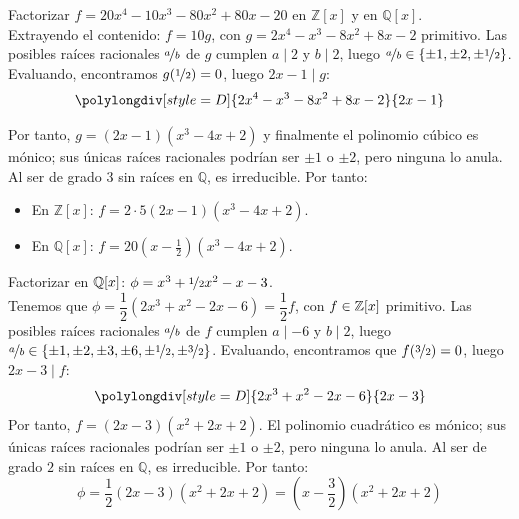 \begin{ejemplo}
    Factorizar $f = 20x^4 - 10x^3 - 80x^2 + 80x - 20$ en $\mathbb{Z}[x]$ y en $\mathbb{Q}[x]$.\\

    Extrayendo el contenido: $f = 10 g$, con $g = 2x^4 - x^3 - 8x^2 + 8x - 2$ primitivo. Las posibles raíces racionales $\nicefrac{a}{b}$ de $g$ cumplen $a \mid 2$ y $b \mid 2$, luego $\nicefrac{a}{b} \in \{\pm 1, \pm 2, \pm \nicefrac{1}{2}\}$. Evaluando, encontramos $g(\nicefrac{1}{2}) = 0$, luego $2x - 1 \mid g$:
    \begin{equation*}
        \polylongdiv[style=D]{2x^4 - x^3 - 8x^2 + 8x - 2}{2x - 1}
    \end{equation*}

    Por tanto, $g = (2x - 1)(x^3 - 4x + 2)$ y finalmente el polinomio cúbico es mónico; sus únicas raíces racionales podrían ser $\pm 1$ o $\pm 2$, pero ninguna lo anula. Al ser de grado $3$ sin raíces en $\mathbb{Q}$, es irreducible. Por tanto:
    \begin{itemize}
        \item En $\mathbb{Z}[x]$: $f = 2 \cdot 5 (2x - 1)(x^3 - 4x + 2)$.
        \item En $\mathbb{Q}[x]$: $f = 20 \left(x - \frac{1}{2}\right)(x^3 - 4x + 2)$.
    \end{itemize}
\end{ejemplo}

\begin{ejemplo}
    Factorizar en $\mathbb Q[x]$: $\phi=x^3+\nicefrac{1}{2}x^2-x-3$.\\

    Tenemos que $\phi = \dfrac{1}{2}(2x^3+x^2-2x-6)=\dfrac{1}{2}f$, con $f \in \mathbb Z[x]$ primitivo. Las posibles raíces racionales $\nicefrac{a}{b}$ de $f$ cumplen $a \mid -6$ y $b \mid 2$, luego $\nicefrac{a}{b} \in \{\pm 1, \pm 2, \pm 3, \pm 6, \pm \nicefrac{1}{2}, \pm \nicefrac{3}{2}\}$. Evaluando, encontramos que $f(\nicefrac{3}{2}) = 0$, luego $2x - 3 \mid f$:
    \begin{equation*}
        \polylongdiv[style=D]{2x^3 + x^2 - 2x - 6}{2x - 3}
    \end{equation*}
    Por tanto, $f = (2x - 3)(x^2 + 2x + 2)$. El polinomio cuadrático es mónico; sus únicas raíces racionales podrían ser $\pm 1$ o $\pm 2$, pero ninguna lo anula. Al ser de grado $2$ sin raíces en $\mathbb{Q}$, es irreducible. Por tanto:
    \[
        \phi = \dfrac{1}{2}(2x - 3)(x^2 + 2x + 2) = \left(x - \dfrac{3}{2}\right)(x^2 + 2x + 2)
    \]
\end{ejemplo}



